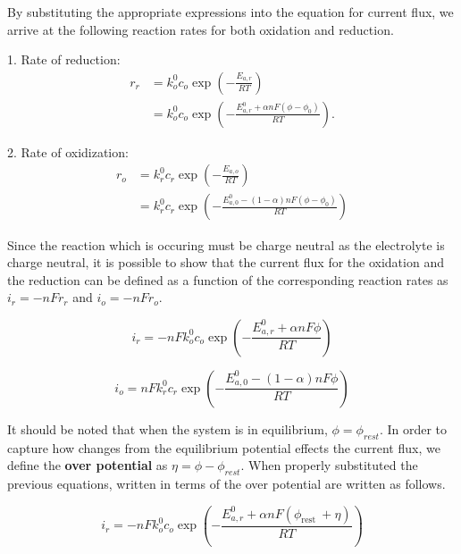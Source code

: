 \documentclass[lettersize,journal]{IEEEtran}
\begin{document}
\noindent By substituting the appropriate expressions into the equation for current flux, we arrive at the following reaction rates for both oxidation and reduction.

1. Rate of reduction:
\begin{equation}
  \begin{aligned}
  r_{r} &=k_{o}^{0} c_{o} \exp \left(-\frac{E_{a, r}}{R T}\right) \\
  &=k_{o}^{0} c_{o} \exp \left(-\frac{E_{a, r}^{0}+\alpha n F\left(\phi-\phi_{0}\right)}{R T}\right) .
  \end{aligned}
\end{equation}

2. Rate of oxidization:
\begin{equation}
  \begin{aligned}
  r_{o} &=k_{r}^{0} c_{r} \exp \left(-\frac{E_{a, o}}{R T}\right) \\
  &=k_{r}^{0} c_{r} \exp \left(-\frac{E_{a, 0}^{0}-(1-\alpha) n F\left(\phi-\phi_{0}\right)}{R T}\right)
  \end{aligned}
\end{equation}


\noindent Since the reaction which is occuring must be charge neutral as the electrolyte is charge neutral, it is possible to show that the current flux for the oxidation and the reduction can be defined as a function of the corresponding reaction rates as $i_r = -nFr_{r} $ and $i_o = -nFr_{o}$.

\begin{equation}
i_{r}=-n F k_{o}^{0} c_{o} \exp \left(-\frac{E_{a, r}^{0}+\alpha n F \phi}{R T}\right)
\end{equation}

\begin{equation}
i_{o}=n F k_{r}^{0} c_{r} \exp \left(-\frac{E_{a, 0}^{0}-(1-\alpha) n F \phi}{R T}\right)
\end{equation}


\noindent It should be noted that when the system is in equilibrium, $\phi = \phi_{rest}$. In order to capture how changes from the equilibrium potential effects the current flux, we define the \textbf{over potential} as $\eta = \phi - \phi_{rest}$. When properly substituted the previous equations, written in terms of the over potential are written as follows.

\begin{equation}
i_{r}=-n F k_{o}^{0} c_{o} \exp \left(-\frac{E_{a, r}^{0}+\alpha n F\left(\phi_{\text {rest }}+\eta\right)}{R T}\right)
\end{equation}
\end{document}
